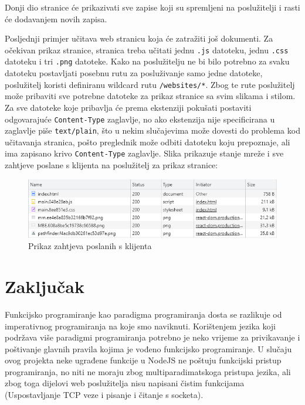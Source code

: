 \documentclass[]{foi}
\begin{document}
Donji dio stranice će prikazivati sve zapise koji su spremljeni na poslužitelji
i rasti će dodavanjem novih zapisa.

Posljednji primjer učitava web stranicu koja će zatražiti još dokumenti. Za očekivan
prikaz stranice, stranica treba učitati jednu \texttt{.js} datoteku, jednu \texttt{.css}
datoteku i tri \texttt{.png} datoteke. Kako na poslužitelju ne bi bilo potrebno za svaku
datoteku postavljati posebnu rutu za posluživanje samo jedne datoteke, poslužitelj
koristi definiranu wildcard rutu \texttt{/websites/*}. Zbog te rute poslužitelj može
pribaviti sve potrebne datoteke za prikaz stranice sa svim slikama i stilom.
Za sve datoteke koje pribavlja će prema ekstenziji pokušati postaviti odgovarajuće
\texttt{Content-Type} zaglavlje, no ako ekstenzija nije specificirana u zaglavlje piše
\texttt{text/plain}, što u nekim slučajevima može dovesti do problema kod učitavanja
stranica, pošto preglednik može odbiti datoteku koju prepoznaje, ali ima zapisano krivo
\texttt{Content-Type} zaglavlje.
Slika prikazuje stanje mreže i sve zahtjeve poslane s klijenta na poslužitelj za
prikaz stranice:
\begin{figure}[h]
	\centering
	\includegraphics[width=\textwidth]{slike/mreza.png}
	\caption{Prikaz zahtjeva poslanih s klijenta}
	\label{fig:mreza}
\end{figure}


\chapter{Zaključak}

Funkcijsko programiranje kao paradigma programiranja dosta se razlikuje od
imperativnog programiranja na koje smo naviknuti. Korištenjem jezika koji
podržava više paradigmi programiranja potrebno je neko vrijeme za privikavanje
i poštivanje glavnih pravila kojima je vođeno funkcijsko programiranje. U
slučaju ovog projekta neke ugrađene funkcije u NodeJS ne poštuju funkcijski
pristup programiranja, no niti ne moraju zbog multiparadimatskoga pristupa
jezika, ali zbog toga dijelovi web poslužitelja nisu napisani čistim funkcijama
(Uspostavljanje TCP veze i pisanje i čitanje s socketa).
\end{document}
